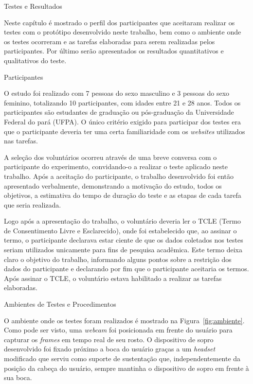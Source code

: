 \begin{chapter}{Testes e Resultados}

Neste capítulo é mostrado o perfil dos participantes que aceitaram realizar os
testes com o protótipo desenvolvido neste trabalho, bem como o ambiente onde os
testes ocorreram e as tarefas elaboradas para serem realizadas pelos
participantes.  Por último serão apresentados os resultados quantitativos e
qualitativos do teste.  %


\begin{section}{Participantes}

O estudo foi realizado com 7 pessoas do sexo masculino e 3 pessoas do sexo
feminino, totalizando 10 participantes, com idades entre 21 e 28 anos.
Todos os participantes são estudantes de graduação ou pós-graduação da
Universidade Federal do pará (UFPA). O único critério exigido para participar
dos testes era que o participante deveria ter uma certa familiaridade com os
\textit{websites} utilizados nas tarefas.  

A seleção dos voluntários ocorreu através de uma breve conversa com o
participante do experimento, convidando-o a realizar o teste aplicado neste
trabalho. Após a aceitação do participante, o trabalho desenvolvido foi então
apresentado verbalmente, demonstrando a motivação do estudo, todos os objetivos,
a estimativa do tempo de duração do teste e as etapas de cada tarefa que
seria realizada. 

Logo após a apresentação do trabalho, o voluntário deveria ler o TCLE (Termo de
Consentimento Livre e Esclarecido), onde foi estabelecido que, ao assinar o
termo, o participante declarava estar ciente de que os dados coletados nos
testes seriam utilizados unicamente para fins de pesquisa acadêmica. Este termo
deixa claro o objetivo do trabalho, informando alguns pontos sobre a restrição
dos dados do participante e declarando por fim que o participante aceitaria os
termos. Após assinar o TCLE, o voluntário estava habilitado a realizar as
tarefas elaboradas. 

\end{section}

\begin{section}{Ambientes de Testes e Procedimentos}

O ambiente onde os testes foram realizados é mostrado na
Figura~\ref{fig:ambiente}.  Como pode ser visto, uma \textit{webcam} foi
posicionada em frente do usuário para capturar os \textit{frames} em tempo real
de seu rosto. O dispositivo de sopro desenvolvido foi fixado próximo a boca do
usuário graças a um \textit{headset} modificado que serviu como suporte de
sustentação que, independentemente da posição da cabeça do usuário, sempre
mantinha o dispositivo de sopro em frente à sua boca.


\end{section}
\end{chapter}
